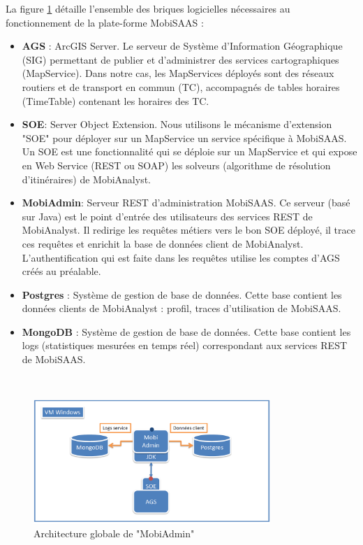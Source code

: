 La figure \ref{fig:architecture} détaille l'ensemble des briques logicielles nécessaires au fonctionnement de la plate-forme MobiSAAS :
\begin{itemize}
\item \textbf{AGS} : ArcGIS Server. Le serveur de Système d'Information Géographique (SIG) permettant de publier et d'administrer des services cartographiques (MapService).
Dans notre cas, les MapServices déployés sont des réseaux routiers et de transport en commun (TC), accompagnés de tables horaires (TimeTable) contenant les horaires des TC.
\item \textbf{SOE}: Server Object Extension. Nous utilisons le mécanisme d'extension "SOE" pour déployer sur un MapService un service spécifique à MobiSAAS. Un SOE est une fonctionnalité qui se déploie sur un MapService et qui expose en Web Service (REST ou SOAP) les solveurs (algorithme de résolution d'itinéraires) de MobiAnalyst.
\item \textbf{MobiAdmin}: Serveur REST d'administration MobiSAAS. Ce serveur (basé sur Java) est le point d'entrée des utilisateurs des services REST de MobiAnalyst.
Il redirige les requêtes métiers vers le bon SOE déployé, il trace ces requêtes et enrichit la base de données client de MobiAnalyst.
L'authentification qui est faite dans les requêtes utilise les comptes d'AGS créés au préalable.
\item \textbf{Postgres} : Système de gestion de base de données. Cette base contient les données clients de MobiAnalyst : profil, traces d'utilisation de MobiSAAS.
\item \textbf{MongoDB} : Système de gestion de base de données. Cette base contient les logs (statistiques mesurées en temps réel) correspondant aux services REST de MobiSAAS.
\end{itemize}\\

\begin{figure}[h]
	\centering
		\includegraphics[width=0.8\textwidth]{images/architecture.png}
	\caption{Architecture globale de "MobiAdmin"}
	\label{fig:architecture}
\end{figure}\\

